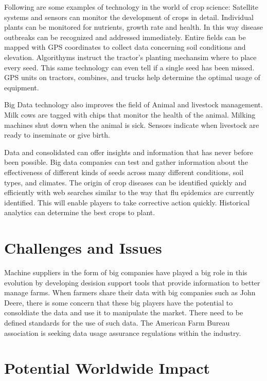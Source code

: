 \documentclass[sigconf]{acmart}
\begin{document}
Following are some examples of technology in the world of crop science: Satellite systems and sensors can monitor the development of crops in detail. Individual plants can be monitored for nutrients, growth rate and health. In this way disease outbreaks can be recognized and addressed immediately.  Entire fields can be mapped with GPS coordinates to collect data concerning soil conditions and elevation. Algorithyms instruct the tractor's planting mechansim where to place every seed. This same technology can even tell if a single seed has been missed. GPS units on tractors, combines, and trucks help determine the optimal usage of equipment.

Big Data technology also improves the field of Animal and livestock management. Milk cows are tagged with chips that monitor the health of the animal. Milking machines shut down when the animal is sick. Sensors indicate when livestock are ready to inseminate or give birth. 

Data and consolidated can offer insights and information that has never before been possible. Big data companies can test and gather information about the effectiveness of different kinds of seeds across many different conditions, soil types, and climates. The origin of crop diseases can be identified quickly and efficiently with web searches similar to the way that flu epidemics are currently identified. This will enable players to take corrective action quickly. Historical analytics can determine the best crops to plant. 





\section{Challenges and Issues}

Machine suppliers in the form of big companies have played a big role in this evolution by developing desision support tools that provide information to better manage farms. When farmers share their data with big companies such as John Deere, there is some concern that these big players have the potential to consoldiate the data and use it to manipulate the market. There need to be defined standards for the use of such data. The American Farm Bureau association is seeking data usage assurance regulations within the industry.

\section{Potential Worldwide Impact}
\end{document}
